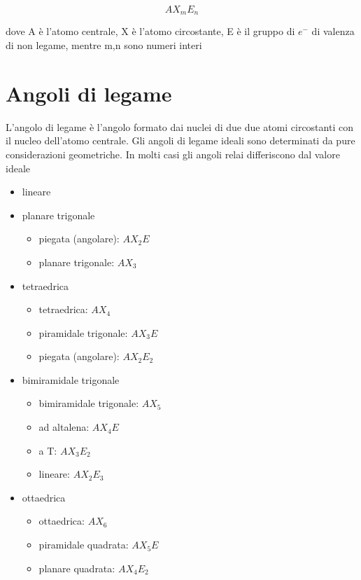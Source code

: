 \documentclass[a4paper,11pt]{report}
\begin{document}
\begin{equation*}
	AX_mE_n
\end{equation*}

\noindent dove A è l'atomo centrale, X è l'atomo circostante, E è il gruppo di $e^-$ di valenza di non legame, mentre m,n sono numeri interi

\section{Angoli di legame}

L'angolo di legame è l'angolo formato dai nuclei di due due atomi circostanti con il nucleo dell'atomo centrale. Gli angoli di legame ideali sono determinati da pure considerazioni geometriche. In molti casi gli angoli relai differiscono dal valore ideale

\begin{itemize}
	\item lineare
	\item planare trigonale
	\begin{itemize}
		\item piegata (angolare): $AX_2E$
		\item planare trigonale: $AX_3$
	\end{itemize}
	\item tetraedrica
	\begin{itemize}
		\item tetraedrica: $AX_4$
		\item piramidale trigonale: $AX_3E$ 
		\item piegata (angolare): $AX_2E_2$
	\end{itemize}
	\item bimiramidale trigonale
	\begin{itemize}
		\item bimiramidale trigonale: $AX_5$
		\item ad altalena: $AX_4E$
		\item a T: $AX_3E_2$
		\item lineare: $AX_2E_3$
	\end{itemize}
	\item ottaedrica
	\begin{itemize}
		\item ottaedrica: $AX_6$
		\item piramidale quadrata: $AX_5E$
		\item planare quadrata: $AX_4E_2$
	\end{itemize}
\end{itemize}
\end{document}
